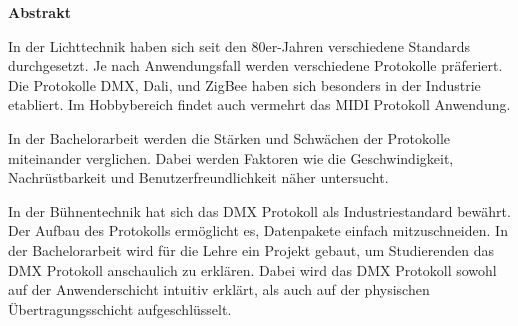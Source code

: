 \thispagestyle{plain} %

{\huge\textbf{Abstrakt}}
\vspace{1cm}

In der Lichttechnik haben sich seit den 80er-Jahren verschiedene Standards durchgesetzt. Je nach Anwendungsfall werden verschiedene Protokolle präferiert. Die Protokolle DMX, Dali, und ZigBee haben sich besonders in der Industrie etabliert. Im Hobbybereich findet auch vermehrt das MIDI Protokoll Anwendung.

In der Bachelorarbeit werden die Stärken und Schwächen der Protokolle miteinander verglichen. Dabei werden Faktoren wie die Geschwindigkeit, Nachrüstbarkeit und Benutzerfreundlichkeit näher untersucht.

In der Bühnentechnik hat sich das DMX Protokoll als Industriestandard bewährt. Der Aufbau des Protokolls ermöglicht es, Datenpakete einfach mitzuschneiden. In der Bachelorarbeit wird für die Lehre ein Projekt gebaut, um Studierenden das DMX Protokoll anschaulich zu erklären. Dabei wird das DMX Protokoll sowohl auf der Anwenderschicht intuitiv erklärt, als auch auf der physischen Übertragungsschicht aufgeschlüsselt.